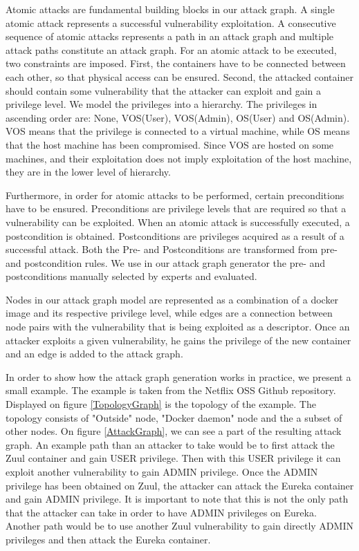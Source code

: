 \documentclass[letterpaper, 10 pt, conference]{ieeeconf}  %
\begin{document}
Atomic attacks are fundamental building blocks in our attack graph. A single atomic attack represents a successful vulnerability exploitation. A consecutive sequence of atomic attacks represents a path in an attack graph and multiple attack paths constitute an attack graph. For an atomic attack to be executed, two constraints are imposed. First, the containers have to be connected between each other, so that physical access can be ensured. Second, the attacked container should contain some vulnerability that the attacker can exploit and gain a privilege level. We model the privileges into a hierarchy. The privileges in ascending order are: None, VOS(User), VOS(Admin), OS(User) and OS(Admin). VOS means that the privilege is connected to a virtual machine, while OS means that the host machine has been compromised. Since VOS are hosted on some machines, and their exploitation does not imply exploitation of the host machine, they are in the lower level of hierarchy.\cite{aksu}

Furthermore, in order for atomic attacks to be performed, certain preconditions have to be ensured. Preconditions are privilege levels that are required so that a vulnerability can be exploited. When an atomic attack is successfully executed, a postcondition is obtained. Postconditions are privileges acquired as a result of a successful attack. Both the Pre- and Postconditions are transformed from pre- and postcondition rules. We use in our attack graph generator the pre- and postconditions manually selected by experts and evaluated.\cite{aksu}

Nodes in our attack graph model are represented as a combination of a docker image and its respective privilege level, while edges are a connection between node pairs with the vulnerability that is being exploited as a descriptor. Once an attacker exploits a given vulnerability, he gains the privilege of the new container and an edge is added to the attack graph.

In order to show how the attack graph generation works in practice, we present a small example. The example is taken from the Netflix OSS Github repository.\cite{netflixoss} Displayed on figure \ref{TopologyGraph} is the topology of the example. The topology consists of "Outside" node, "Docker daemon" node and the a subset of other nodes. On figure \ref{AttackGraph}, we can see a part of the resulting attack graph. An example path than an attacker to take would be to first attack the Zuul container and gain USER privilege. Then with this USER privilege it can exploit another vulnerability to gain ADMIN privilege. Once the ADMIN privilege has been obtained on Zuul, the attacker can attack the Eureka container and gain ADMIN privilege. It is important to note that this is not the only path that the attacker can take in order to have ADMIN privileges on Eureka. Another path would be to use another Zuul vulnerability to gain directly ADMIN privileges and then attack the Eureka container.
\end{document}
